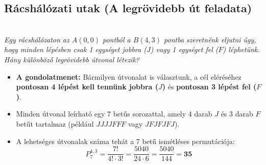 \documentclass[11pt, a4paper]{article}
\begin{document}
    \vspace{0.4cm}

\subsection{Rácshálózati utak (A legrövidebb út feladata)}\\
    \textit{Egy rácshálózaton az $A(0,0)$ pontból a $B(4,3)$ pontba szeretnénk eljutni úgy, hogy minden lépésben csak 1 egységet jobbra ($J$) vagy 1 egységet fel ($F$) léphetünk. Hány különböző legrövidebb útvonal létezik?}
    \begin{itemize}
        \item \textbf{A gondolatmenet:} Bármilyen útvonalat is választunk, a cél eléréséhez \textbf{pontosan 4 lépést kell tennünk jobbra ($J$)} és \textbf{pontosan 3 lépést fel ($F$)}.
        \item Minden útvonal leírható egy 7 betűs sorozattal, amely 4 darab $J$ és 3 darab $F$ betűt tartalmaz (például $J J J J F F F$ vagy $J F J F J F J$).
        \item A lehetséges útvonalak száma tehát a 7 betű ismétléses permutációja:
        \[
        P_7^{4, 3} = \frac{7!}{4! \cdot 3!} = \frac{5040}{24 \cdot 6} = \frac{5040}{144} = \mathbf{35}
        \]
    \end{itemize}
\end{document}
